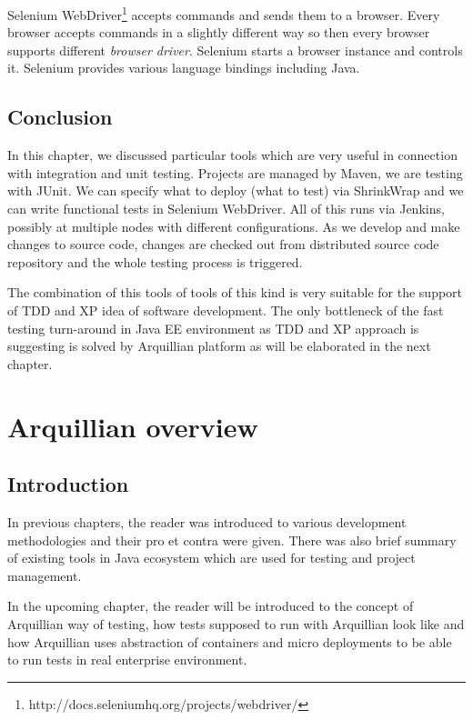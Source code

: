 \documentclass[12pt,final,oneside]{fithesis}
\begin{document}
Selenium WebDriver\footnote{http://docs.seleniumhq.org/projects/webdriver/} accepts commands and sends them to a browser. Every browser accepts commands in a slightly different way so then every browser supports different \textit{browser driver}. Selenium starts a browser instance and controls it. Selenium provides various language bindings including Java.

	\section{Conclusion}
	
In this chapter, we discussed particular tools which are very useful in connection with integration and unit testing. Projects are managed by Maven, we are testing with JUnit. We can specify what to deploy (what to test) via ShrinkWrap and we can write functional tests in Selenium WebDriver. All of this runs via Jenkins, possibly at multiple nodes with different configurations. As we develop and make changes to source code, changes are checked out from distributed source code repository and the whole testing process is triggered.

The combination of this tools of tools of this kind is very suitable for the support of TDD and XP idea of software development. The only bottleneck of the fast testing turn-around in Java EE environment as TDD and XP approach is suggesting is solved by Arquillian platform as will be elaborated in the next chapter. 

\chapter{Arquillian overview}

	\section{Introduction}

In previous chapters, the reader was introduced to various development methodologies and their pro et contra were given. There was also brief summary of existing tools in Java ecosystem which are used for testing and project management.

In the upcoming chapter, the reader will be introduced to the concept of Arquillian\cite{bib070} way of testing, how tests supposed to run with Arquillian look like and how Arquillian uses abstraction of containers and micro deployments to be able to run tests in real enterprise environment.
\end{document}
